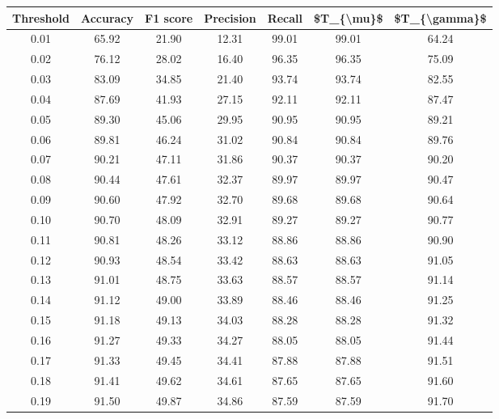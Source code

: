 \begin{tabular}{|c|c|c|c|c|c|c|}
\toprule
 Threshold &  Accuracy &  F1 score &  Precision &  Recall &  \$T\_\{\textbackslash mu\}\$ &  \$T\_\{\textbackslash gamma\}\$ \\
\hline
      0.01 &     65.92 &     21.90 &      12.31 &   99.01 &      99.01 &         64.24 \\
      0.02 &     76.12 &     28.02 &      16.40 &   96.35 &      96.35 &         75.09 \\
      0.03 &     83.09 &     34.85 &      21.40 &   93.74 &      93.74 &         82.55 \\
      0.04 &     87.69 &     41.93 &      27.15 &   92.11 &      92.11 &         87.47 \\
      0.05 &     89.30 &     45.06 &      29.95 &   90.95 &      90.95 &         89.21 \\
      0.06 &     89.81 &     46.24 &      31.02 &   90.84 &      90.84 &         89.76 \\
      0.07 &     90.21 &     47.11 &      31.86 &   90.37 &      90.37 &         90.20 \\
      0.08 &     90.44 &     47.61 &      32.37 &   89.97 &      89.97 &         90.47 \\
      0.09 &     90.60 &     47.92 &      32.70 &   89.68 &      89.68 &         90.64 \\
      0.10 &     90.70 &     48.09 &      32.91 &   89.27 &      89.27 &         90.77 \\
      0.11 &     90.81 &     48.26 &      33.12 &   88.86 &      88.86 &         90.90 \\
      0.12 &     90.93 &     48.54 &      33.42 &   88.63 &      88.63 &         91.05 \\
      0.13 &     91.01 &     48.75 &      33.63 &   88.57 &      88.57 &         91.14 \\
      0.14 &     91.12 &     49.00 &      33.89 &   88.46 &      88.46 &         91.25 \\
      0.15 &     91.18 &     49.13 &      34.03 &   88.28 &      88.28 &         91.32 \\
      0.16 &     91.27 &     49.33 &      34.27 &   88.05 &      88.05 &         91.44 \\
      0.17 &     91.33 &     49.45 &      34.41 &   87.88 &      87.88 &         91.51 \\
      0.18 &     91.41 &     49.62 &      34.61 &   87.65 &      87.65 &         91.60 \\
      0.19 &     91.50 &     49.87 &      34.86 &   87.59 &      87.59 &         91.70 \\

\end{tabular}
